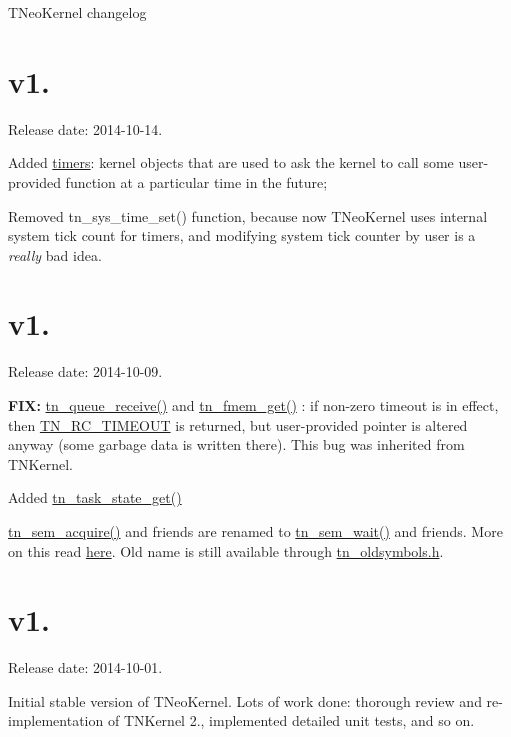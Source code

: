 T\+Neo\+Kernel changelog\hypertarget{changelog_changelog_v1_02}{}\section{v1.}\label{changelog_changelog_v1_02}
Release date\+: 2014-\/10-\/14.


\begin{DoxyItemize}
\item Added \hyperlink{tn__timer_8h}{timers}\+: kernel objects that are used to ask the kernel to call some user-\/provided function at a particular time in the future;
\item Removed {\ttfamily tn\+\_\+sys\+\_\+time\+\_\+set()} function, because now T\+Neo\+Kernel uses internal system tick count for timers, and modifying system tick counter by user is a {\itshape really} bad idea.
\end{DoxyItemize}\hypertarget{changelog_changelog_v1_01}{}\section{v1.}\label{changelog_changelog_v1_01}
Release date\+: 2014-\/10-\/09.


\begin{DoxyItemize}
\item {\bfseries F\+I\+X\+:} {\ttfamily \hyperlink{tn__dqueue_8h_a589bfb4d3966bc7405dcf959d7114544}{tn\+\_\+queue\+\_\+receive()}} and {\ttfamily \hyperlink{tn__fmem_8h_afb45a1f427b531b22f1f4b013f415ae0}{tn\+\_\+fmem\+\_\+get()}} \+: if non-\/zero {\ttfamily timeout} is in effect, then {\ttfamily \hyperlink{tn__common_8h_aa43bd3da1ad4c1e61224b5f23b369876a5b4d73fde6b5d1c9579c02e6aafce1fb}{T\+N\+\_\+\+R\+C\+\_\+\+T\+I\+M\+E\+O\+U\+T}} is returned, but user-\/provided pointer is altered anyway (some garbage data is written there). This bug was inherited from T\+N\+Kernel.
\item Added {\ttfamily \hyperlink{tn__tasks_8h_a18408d825c0dab03511f3aaeeb3ffbb3}{tn\+\_\+task\+\_\+state\+\_\+get()}}
\item {\ttfamily \hyperlink{tn__oldsymbols_8h_abdc5c428590ff525cdb566da613015ce}{tn\+\_\+sem\+\_\+acquire()}} and friends are renamed to {\ttfamily \hyperlink{tn__sem_8h_a6bf88a78f4f8b2799f72ee671b52ed97}{tn\+\_\+sem\+\_\+wait()}} and friends. More on this read \hyperlink{tnkernel_diff_tnkernel_diff_api_rename_sem}{here}. Old name is still available through {\ttfamily \hyperlink{tn__oldsymbols_8h}{tn\+\_\+oldsymbols.\+h}}.
\end{DoxyItemize}\hypertarget{changelog_changelog_v1_0}{}\section{v1.}\label{changelog_changelog_v1_0}
Release date\+: 2014-\/10-\/01.


\begin{DoxyItemize}
\item Initial stable version of T\+Neo\+Kernel. Lots of work done\+: thorough review and re-\/implementation of T\+N\+Kernel 2., implemented detailed unit tests, and so on. 
\end{DoxyItemize}